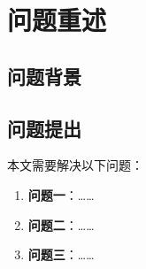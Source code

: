 \section{问题重述}

\subsection{问题背景}


\subsection{问题提出}

本文需要解决以下问题：

\begin{enumerate}
  \item \textbf{问题一}：……
  \item \textbf{问题二}：……
  \item \textbf{问题三}：……
\end{enumerate}
